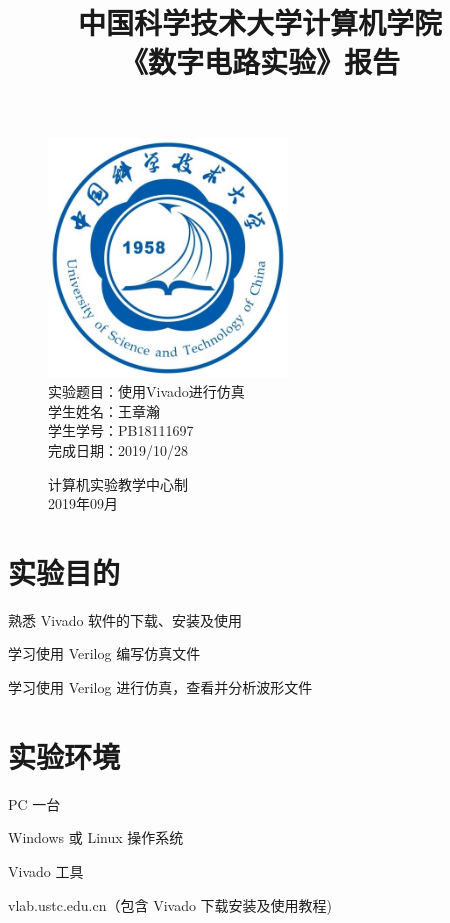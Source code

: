 \documentclass[UTF8]{article}
\title{中国科学技术大学计算机学院\\《数字电路实验》报告}
\author{}
\date{}
\begin{document}
	\maketitle
	\begin{figure}[H]
		\centering
		\includegraphics[width=2.5in]{xiaohui.jpg}\vspace{0.5cm}\\
		\large{
			实验题目：使用Vivado进行仿真\\
			学生姓名：王章瀚\\
			学生学号：PB18111697\\
			完成日期：2019/10/28\\
		}\vspace{2cm}
		
		\large{计算机实验教学中心制\\2019年09月\\}
		\thispagestyle{empty}
		\clearpage  %
	\end{figure}


	\section{实验目的}
	熟悉 Vivado 软件的下载、安装及使用\par
	学习使用 Verilog 编写仿真文件\par
	学习使用 Verilog 进行仿真，查看并分析波形文件\par
	
	\section{实验环境}
	PC 一台\par
	Windows 或 Linux 操作系统\par
	Vivado 工具\par
	vlab.ustc.edu.cn（包含 Vivado 下载安装及使用教程)\par
	
\end{document}
